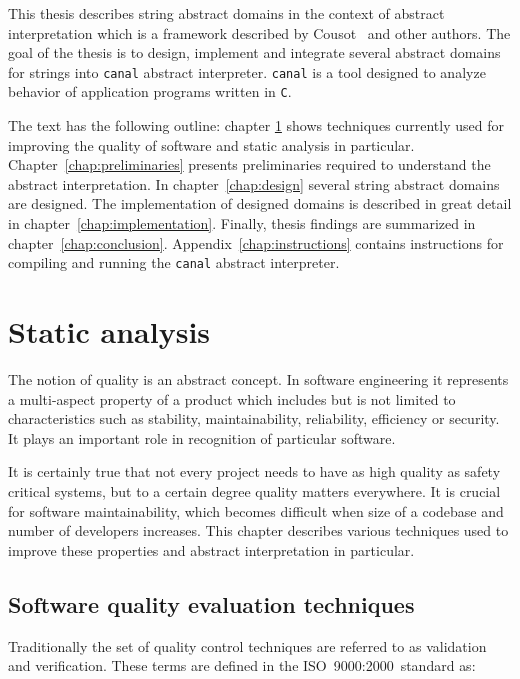 \documentclass[12pt,final,oneside]{fithesis2}
\theoremstyle{definition}
\begin{document}
This thesis describes string abstract domains in the context of abstract
interpretation which is a framework described by Cousot~\cite{CousotCousot77-1}
\cite{Cousot00-1} \cite{CousotCousot92-4} \cite{CousotCousot99-1} and other
authors. The goal of the thesis is to design, implement and integrate several
abstract domains for strings into \texttt{canal} abstract interpreter.
\texttt{canal} is a tool designed to analyze behavior of application programs
written in \texttt{C}.

The text has the following outline: chapter \ref{chap:staticanalysis} shows
techniques currently used for improving the quality of software and static
analysis in particular. Chapter~\ref{chap:preliminaries}
presents preliminaries required to understand the abstract interpretation.
In chapter~\ref{chap:design} several string abstract domains are designed.
The implementation of designed domains is described in great detail in
chapter~\ref{chap:implementation}. Finally, thesis findings are summarized
in chapter~\ref{chap:conclusion}. Appendix~\ref{chap:instructions} contains
instructions for compiling and running the \texttt{canal} abstract
interpreter.


\chapter{Static analysis}
\label{chap:staticanalysis}

The notion of quality is an abstract concept. In software engineering it
represents a multi-aspect property of a product which includes but is not
limited to characteristics such as stability, maintainability, reliability,
efficiency or security. It plays an important role in recognition of
particular software.

It is certainly true that not every project needs to have as high quality as
safety critical systems, but to a certain degree quality matters
everywhere. It is crucial for software maintainability, which becomes
difficult when size of a codebase and number of developers
increases. This chapter describes various techniques used to
improve these properties and abstract interpretation in particular.


\section{Software quality evaluation techniques}
\label{sec:softwarequality}

Traditionally the set of quality control techniques are referred to as
validation and verification. These terms are defined in the
ISO~9000:2000~standard \cite{iso9000-2000} as:
\end{document}
